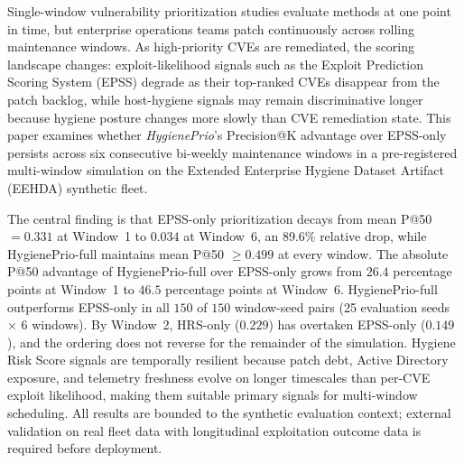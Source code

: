 Single-window vulnerability prioritization studies evaluate methods at one point in time, but enterprise operations teams patch continuously across rolling maintenance windows. As high-priority CVEs are remediated, the scoring landscape changes: exploit-likelihood signals such as the Exploit Prediction Scoring System (EPSS) degrade as their top-ranked CVEs disappear from the patch backlog, while host-hygiene signals may remain discriminative longer because hygiene posture changes more slowly than CVE remediation state. This paper examines whether \textit{HygienePrio}'s Precision@K advantage over EPSS-only persists across six consecutive bi-weekly maintenance windows in a pre-registered multi-window simulation on the Extended Enterprise Hygiene Dataset Artifact (EEHDA) synthetic fleet.

The central finding is that EPSS-only prioritization decays from mean P@50 $= 0.331$ at Window~1 to $0.034$ at Window~6, an 89.6\% relative drop, while HygienePrio-full maintains mean P@50 $\geq 0.499$ at every window. The absolute P@50 advantage of HygienePrio-full over EPSS-only grows from $26.4$ percentage points at Window~1 to $46.5$ percentage points at Window~6. HygienePrio-full outperforms EPSS-only in all $150$ of $150$ window-seed pairs (25 evaluation seeds $\times$ 6 windows). By Window~2, HRS-only ($0.229$) has overtaken EPSS-only ($0.149$), and the ordering does not reverse for the remainder of the simulation. Hygiene Risk Score signals are temporally resilient because patch debt, Active Directory exposure, and telemetry freshness evolve on longer timescales than per-CVE exploit likelihood, making them suitable primary signals for multi-window scheduling. All results are bounded to the synthetic evaluation context; external validation on real fleet data with longitudinal exploitation outcome data is required before deployment.
